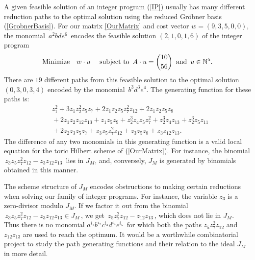 A given feasible solution of an integer program (\ref{IP})
usually has many different reduction paths to the optimal solution
using  the reduced Gr\"obner basis (\ref{GrobnerBasis}). 
For our matrix \ref{OurMatrix} and cost vector 
$w = (9,3,5,0,0)$, the monomial
$\, a^2 b d e^6 \,$  encodes the feasible solution $(2,1,0,1,6)$
of the integer program 
$$ {\rm Minimize} \quad
w \cdot u \,\,\quad
{\rm subject} \,\, {\rm to } \,\,\,
A \cdot u = \binom{10}{56}   \,\,\, {\rm and}
 \,\,\,u \in \mathbb{N}^5.$$
There are $19$ different paths from this feasible solution 
to the optimal solution $(0,3,0,3,4)$ encoded by the monomial 
$\, b^3 d^3 e^4 $. The generating function for these paths is:
\begin{eqnarray*}
& z_1^2 + 3 z_1 z_2^2 z_5 z_7 + 2 z_1 z_2 z_5 z_7^2 z_{12}
 + 2 z_1 z_2 z_5 z_8 \\ & {} + 2 z_1 z_2 z_{12} z_{13} + z_1 z_5 z_9 
 + z_2^3 z_4 z_5 z_7^2 + z_2^3 z_4 z_{13} + z_2^3 z_5 z_{11} \\ & {} 
 + 2 z_2 z_3 z_5 z_7 + z_3 z_5 z_7^2 z_{12} + z_3 z_5 z_8 + z_3 z_{12} z_{13}.
\end{eqnarray*}
The difference of any two monomials in this generating function 
is a valid local equation for the toric Hilbert scheme of
(\ref{OurMatrix}). For instance, the binomial 
$\,  z_3 z_5 z_7^2 z_{12} - z_3 z_{12} z_{13} \,$ lies in $J_M$,
and, conversely, $J_M$ is generated by binomials obtained in this manner.

The scheme structure of $J_M$ encodes obstructions to making certain
reductions when solving our family of integer programs. For instance,
the variable $z_3$ is a zero-divisor modulo $J_M$. If we factor it
out from the binomial $\,  z_3 z_5 z_7^2 z_{12} - z_3 z_{12} z_{13}
\in J_M \,$, we get 
$\, z_5 z_7^2 z_{12} - z_{12} z_{13} \,$,
which does not lie in $J_M$. Thus there is no monomial
$a^{i_1} b^{i_2} c^{i_3} d^{i_4} e^{i_5} \,$
for which both the paths $ z_5 z_7^2 z_{12} $ and
$ z_{12} z_{13} $ are used to reach the optimum.
It would be a worthwhile combinatorial project to
study the path generating functions and their relation
to the ideal $J_M$ in more detail.

